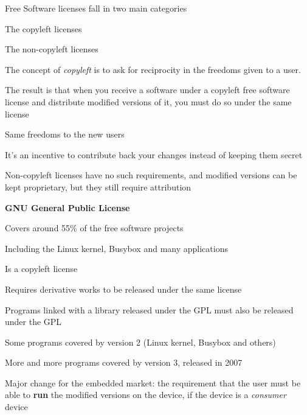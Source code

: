   \startitemize
  \item Free Software licenses fall in two main categories
    \startitemize
    \item The copyleft licenses
    \item The non-copyleft licenses
    \stopitemize
  \item The concept of {\em copyleft} is to ask for reciprocity in the
    freedoms given to a user.
  \item The result is that when you receive a software under a
    copyleft free software license and distribute modified versions of
    it, you must do so under the same license
    \startitemize
    \item Same freedoms to the new users
    \item It's an incentive to contribute back your changes instead of
      keeping them secret
    \stopitemize
  \item Non-copyleft licenses have no such requirements, and modified
    versions can be kept proprietary, but they still require
    attribution
  \stopitemize

  \startitemize
  \item {\bf GNU General Public License}
  \item Covers around 55\% of the free software projects
    \startitemize
    \item Including the Linux kernel, Busybox and many applications
    \stopitemize
  \item Is a copyleft license
    \startitemize
    \item Requires derivative works to be released under the same
      license
    \item Programs linked with a library released under the GPL must
      also be released under the GPL
    \stopitemize
  \item Some programs covered by version 2 (Linux kernel, Busybox and
    others)
  \item More and more programs covered by version 3, released in 2007
    \startitemize
    \item Major change for the embedded market: the requirement that
      the user must be able to {\bf run} the modified versions on the
      device, if the device is a {\em consumer} device
    \stopitemize
  \stopitemize

